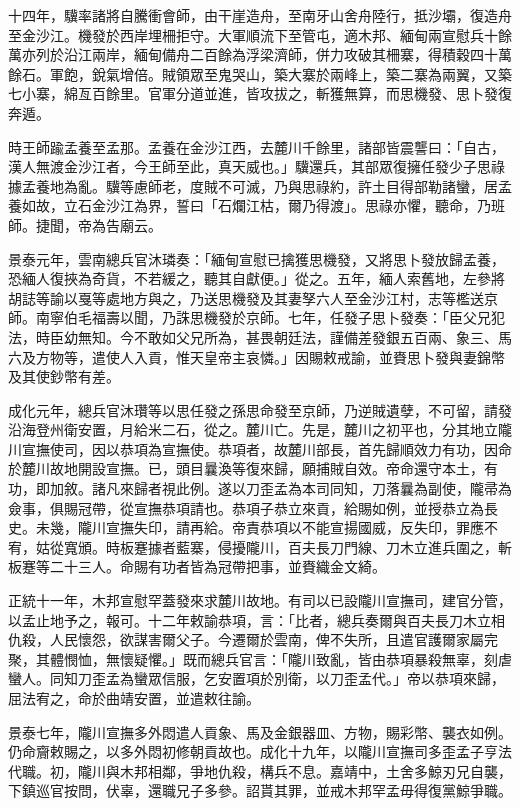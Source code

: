 \begin{pinyinscope}
十四年，驥率諸將自騰衝會師，由干崖造舟，至南牙山舍舟陸行，抵沙壩，復造舟至金沙江。機發於西岸埋柵拒守。大軍順流下至管屯，適木邦、緬甸兩宣慰兵十餘萬亦列於沿江兩岸，緬甸備舟二百餘為浮梁濟師，併力攻破其柵寨，得積穀四十萬餘石。軍飽，銳氣增倍。賊領眾至鬼哭山，築大寨於兩峰上，築二寨為兩翼，又築七小寨，綿亙百餘里。官軍分道並進，皆攻拔之，斬獲無算，而思機發、思卜發復奔遁。

時王師踰孟養至孟那。孟養在金沙江西，去麓川千餘里，諸部皆震讋曰：「自古，漢人無渡金沙江者，今王師至此，真天威也。」驥還兵，其部眾復擁任發少子思祿據孟養地為亂。驥等慮師老，度賊不可滅，乃與思祿約，許土目得部勒諸蠻，居孟養如故，立石金沙江為界，誓曰「石爛江枯，爾乃得渡」。思祿亦懼，聽命，乃班師。捷聞，帝為告廟云。

景泰元年，雲南總兵官沐璘奏：「緬甸宣慰已擒獲思機發，又將思卜發放歸孟養，恐緬人復挾為奇貨，不若緩之，聽其自獻便。」從之。五年，緬人索舊地，左參將胡誌等諭以戛等處地方與之，乃送思機發及其妻孥六人至金沙江村，志等檻送京師。南寧伯毛福壽以聞，乃誅思機發於京師。七年，任發子思卜發奏：「臣父兄犯法，時臣幼無知。今不敢如父兄所為，甚畏朝廷法，謹備差發銀五百兩、象三、馬六及方物等，遣使人入貢，惟天皇帝主哀憐。」因賜敕戒諭，並賚思卜發與妻錦幣及其使鈔幣有差。

成化元年，總兵官沐瓚等以思任發之孫思命發至京師，乃逆賊遺孽，不可留，請發沿海登州衛安置，月給米二石，從之。麓川亡。先是，麓川之初平也，分其地立隴川宣撫使司，因以恭項為宣撫使。恭項者，故麓川部長，首先歸順效力有功，因命於麓川故地開設宣撫。已，頭目曩渙等復來歸，願捕賊自效。帝命還守本土，有功，即加敘。諸凡來歸者視此例。遂以刀歪孟為本司同知，刀落曩為副使，隴帚為僉事，俱賜冠帶，從宣撫恭項請也。恭項子恭立來貢，給賜如例，並授恭立為長史。未幾，隴川宣撫失印，請再給。帝責恭項以不能宣揚國威，反失印，罪應不宥，姑從寬頒。時板蹇據者藍寨，侵擾隴川，百夫長刀門線、刀木立進兵圍之，斬板蹇等二十三人。命賜有功者皆為冠帶把事，並賚織金文綺。

正統十一年，木邦宣慰罕蓋發來求麓川故地。有司以已設隴川宣撫司，建官分管，以孟止地予之，報可。十二年敕諭恭項，言：「比者，總兵奏爾與百夫長刀木立相仇殺，人民懷怨，欲謀害爾父子。今遷爾於雲南，俾不失所，且遣官護爾家屬完聚，其體憫恤，無懷疑懼。」既而總兵官言：「隴川致亂，皆由恭項暴殺無辜，刻虐蠻人。同知刀歪孟為蠻眾信服，乞安置項於別衛，以刀歪孟代。」帝以恭項來歸，屈法宥之，命於曲靖安置，並遣敕往諭。

景泰七年，隴川宣撫多外悶遣人貢象、馬及金銀器皿、方物，賜彩幣、襲衣如例。仍命齎敕賜之，以多外悶初修朝貢故也。成化十九年，以隴川宣撫司多歪孟子亨法代職。初，隴川與木邦相鄰，爭地仇殺，構兵不息。嘉靖中，土舍多鯨刃兄自襲，下鎮巡官按問，伏辜，還職兄子多參。詔貰其罪，並戒木邦罕孟毋得復黨鯨爭職。


\end{pinyinscope}
